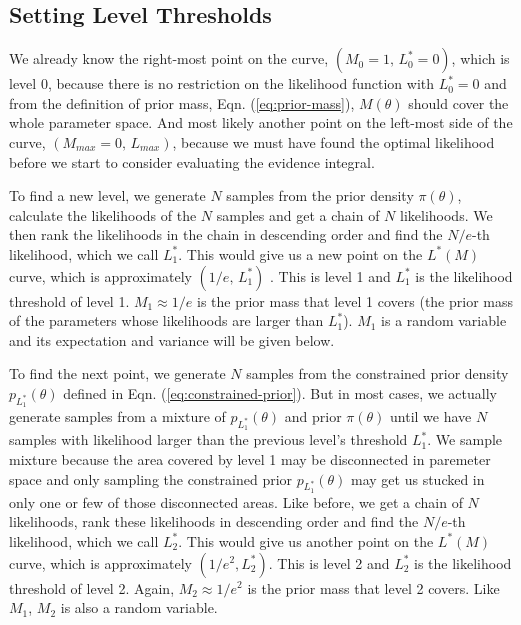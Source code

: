 \documentclass[letterpaper, preprint]{aastex}
\begin{document}
\subsection{Setting Level Thresholds}
We already know the right-most point on the curve, $\left(M_0 = 1,\,L_0^*=0\right)$, which is level 0, because there is no restriction on the likelihood function with $L_0^*=0$ and from the definition of prior mass, Eqn. (\ref{eq:prior-mass}), $M(\theta)$ should cover the whole parameter space. And most likely another point on the left-most side of the curve, $\left(M_{max}=0,\,L_{max}\right)$, because we must have found the optimal likelihood before we start to consider evaluating the evidence integral. 

To find a new level, we generate $N$ samples from the prior density $\pi(\theta)$, calculate the likelihoods of the $N$ samples and get a chain of $N$ likelihoods. We then rank the likelihoods in the chain in descending order and find the $N/e$-th likelihood, which we call $L_1^*$. This would give us a new point on the $L^*(M)$ curve, which is approximately $(1/e,\,L_1^*)$ . This is level 1 and $L_1^*$ is the likelihood threshold of level 1. $M_1\approx1/e$ is the prior mass that level 1 covers (the prior mass of the parameters whose likelihoods are larger than $L_1^*$). $M_1$ is a random variable and its expectation and variance will be given below. 

To find the next point, we generate $N$ samples from the constrained prior density $p_{L_1^*}(\theta)$ defined in Eqn. (\ref{eq:constrained-prior}). But in most cases, we actually generate samples from a mixture of $p_{L_1^*}(\theta)$ and prior $\pi(\theta)$ until we have $N$ samples with likelihood larger than  the previous level's threshold $L_1^*$. We sample  mixture because the area covered by level 1 may be disconnected in paremeter space and only sampling the constrained prior $p_{L_1^*}(\theta)$ may get us stucked in only one or few of those disconnected areas. Like before, we get a chain of $N$ likelihoods, rank these likelihoods in descending order and find the $N/e$-th likelihood, which we call $L_2^*$. This would give us another point on the $L^*(M)$ curve, which is approximately $(1/e^2,L_2^*)$. This is level 2 and $L_2^*$ is the likelihood threshold of level 2. Again, $M_2\approx1/e^2$ is the prior mass that level 2 covers. Like $M_1$, $M_2$ is also a random variable. 
\end{document}
